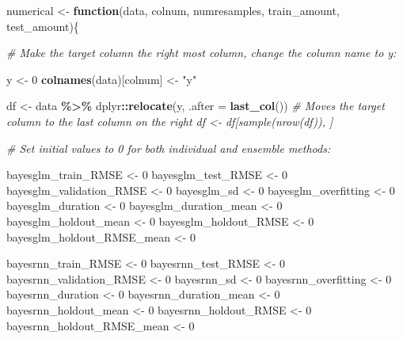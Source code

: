 \documentclass[
]{book}
\newenvironment{Shaded}{\begin{snugshade}}{\end{snugshade}}
\newcommand{\AttributeTok}[1]{\textcolor[rgb]{0.13,0.29,0.53}{#1}}
\newcommand{\CommentTok}[1]{\textcolor[rgb]{0.56,0.35,0.01}{\textit{#1}}}
\newcommand{\ControlFlowTok}[1]{\textcolor[rgb]{0.13,0.29,0.53}{\textbf{#1}}}
\newcommand{\DecValTok}[1]{\textcolor[rgb]{0.00,0.00,0.81}{#1}}
\newcommand{\FunctionTok}[1]{\textcolor[rgb]{0.13,0.29,0.53}{\textbf{#1}}}
\newcommand{\NormalTok}[1]{#1}
\newcommand{\OtherTok}[1]{\textcolor[rgb]{0.56,0.35,0.01}{#1}}
\newcommand{\SpecialCharTok}[1]{\textcolor[rgb]{0.81,0.36,0.00}{\textbf{#1}}}
\newcommand{\StringTok}[1]{\textcolor[rgb]{0.31,0.60,0.02}{#1}}
\begin{document}
\begin{Shaded}
\begin{Highlighting}[]

\NormalTok{numerical }\OtherTok{\textless{}{-}} \ControlFlowTok{function}\NormalTok{(data, colnum, numresamples, train\_amount, test\_amount)\{}

\CommentTok{\# Make the target column the right most column, change the column name to y:}

\NormalTok{y }\OtherTok{\textless{}{-}} \DecValTok{0}
\FunctionTok{colnames}\NormalTok{(data)[colnum] }\OtherTok{\textless{}{-}} \StringTok{"y"}

\NormalTok{df }\OtherTok{\textless{}{-}}\NormalTok{ data }\SpecialCharTok{\%\textgreater{}\%}\NormalTok{ dplyr}\SpecialCharTok{::}\FunctionTok{relocate}\NormalTok{(y, }\AttributeTok{.after =} \FunctionTok{last\_col}\NormalTok{()) }\CommentTok{\# Moves the target column to the last column on the right df \textless{}{-} df[sample(nrow(df)), ]}

\CommentTok{\# Set initial values to 0 for both individual and ensemble methods:}

\NormalTok{bayesglm\_train\_RMSE }\OtherTok{\textless{}{-}} \DecValTok{0}
\NormalTok{bayesglm\_test\_RMSE }\OtherTok{\textless{}{-}} \DecValTok{0}
\NormalTok{bayesglm\_validation\_RMSE }\OtherTok{\textless{}{-}} \DecValTok{0}
\NormalTok{bayesglm\_sd }\OtherTok{\textless{}{-}} \DecValTok{0}
\NormalTok{bayesglm\_overfitting }\OtherTok{\textless{}{-}} \DecValTok{0}
\NormalTok{bayesglm\_duration }\OtherTok{\textless{}{-}} \DecValTok{0}
\NormalTok{bayesglm\_duration\_mean }\OtherTok{\textless{}{-}} \DecValTok{0}
\NormalTok{bayesglm\_holdout\_mean }\OtherTok{\textless{}{-}} \DecValTok{0}
\NormalTok{bayesglm\_holdout\_RMSE }\OtherTok{\textless{}{-}} \DecValTok{0}
\NormalTok{bayesglm\_holdout\_RMSE\_mean }\OtherTok{\textless{}{-}} \DecValTok{0}

\NormalTok{bayesrnn\_train\_RMSE }\OtherTok{\textless{}{-}} \DecValTok{0}
\NormalTok{bayesrnn\_test\_RMSE }\OtherTok{\textless{}{-}} \DecValTok{0}
\NormalTok{bayesrnn\_validation\_RMSE }\OtherTok{\textless{}{-}} \DecValTok{0}
\NormalTok{bayesrnn\_sd }\OtherTok{\textless{}{-}} \DecValTok{0}
\NormalTok{bayesrnn\_overfitting }\OtherTok{\textless{}{-}} \DecValTok{0}
\NormalTok{bayesrnn\_duration }\OtherTok{\textless{}{-}} \DecValTok{0}
\NormalTok{bayesrnn\_duration\_mean }\OtherTok{\textless{}{-}} \DecValTok{0}
\NormalTok{bayesrnn\_holdout\_mean }\OtherTok{\textless{}{-}} \DecValTok{0}
\NormalTok{bayesrnn\_holdout\_RMSE }\OtherTok{\textless{}{-}} \DecValTok{0}
\NormalTok{bayesrnn\_holdout\_RMSE\_mean }\OtherTok{\textless{}{-}} \DecValTok{0}


\end{Highlighting}
\end{Shaded}
\end{document}
